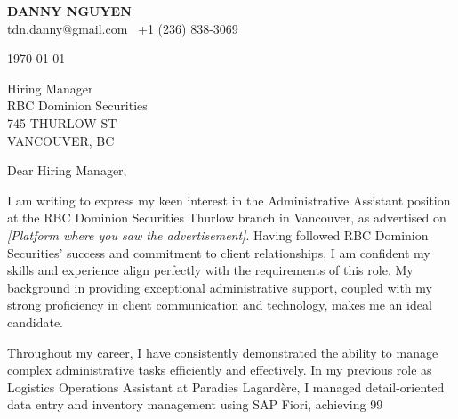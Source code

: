 \documentclass[letterpaper,11pt]{article}
\begin{document}
\textbf{DANNY NGUYEN} \\
tdn.danny@gmail.com \textbullet\ +1 (236) 838-3069 \\
\vspace{20pt}

\today \\
\vspace{20pt}

Hiring Manager \\
RBC Dominion Securities \\
745 THURLOW ST \\
VANCOUVER, BC \\
\vspace{20pt}

Dear Hiring Manager, \\
\vspace{10pt}

I am writing to express my keen interest in the Administrative Assistant position at the RBC Dominion Securities Thurlow branch in Vancouver, as advertised on \textit{[Platform where you saw the advertisement]}.  Having followed RBC Dominion Securities' success and commitment to client relationships, I am confident my skills and experience align perfectly with the requirements of this role.  My background in providing exceptional administrative support, coupled with my strong proficiency in client communication and technology, makes me an ideal candidate.

\vspace{10pt}

Throughout my career, I have consistently demonstrated the ability to manage complex administrative tasks efficiently and effectively.  In my previous role as Logistics Operations Assistant at Paradies Lagardère, I managed detail-oriented data entry and inventory management using SAP Fiori, achieving 99%

\vspace{10pt}
\end{document}
